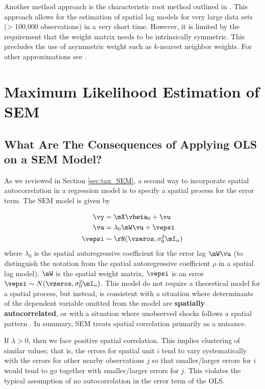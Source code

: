 \documentclass[english,12pt]{book}\usepackage[]{graphicx}\usepackage[]{xcolor}
\begin{document}
Another method approach is the characteristic root method outlined in \cite{smirnov2001fast}. This approach allows for the estimation of spatial lag models for very large data sets (> 100,000 observations) in a very short time. However, it is limited by the requirement that the weight matrix needs to be intrinsically symmetric. This precludes the use of asymmetric weight such as $k$-nearest neighbor weights. For other approximations see \citet[][chapter 4]{lesage2010introduction}.

\section{Maximum Likelihood Estimation of SEM}\label{sec:sem-ml}

\subsection{What Are The Consequences of Applying OLS on a SEM Model?}

As we reviewed in Section \ref{sec:tax_SEM}, a second way to incorporate spatial autocorrelation in a regression model is to specify a spatial process for the error term.  The SEM model is given by

\begin{equation}\label{eq:sem_ml}
	\begin{aligned}
	\vy  & = \mX\vbeta_0 + \vu \\ 
	 \vu & = \lambda_0 \mW \vu + \vepsi \\
	 \vepsi & \sim \rN(\vzeros, \sigma^2_0\mI_n)
	\end{aligned}
\end{equation}
%
where $\lambda_0$ is the spatial autoregressive coefficient for the error lag $\mW\vu$ (to distinguish the notation from the spatial autoregressive coefficient $\rho$ in a spatial lag model), $\mW$ is the spatial weight matrix, $\vepsi$ is an error $\vepsi \sim N(\vzeros, \sigma^2_0\mI_n)$. This model do not require a theoretical model for a spatial process, but instead, is consistent with a situation where determinants of the dependent variable omitted from the model are \textbf{spatially autocorrelated}, or with a situation where unobserved shocks follows a spatial pattern \citep{elhorst2014spatial}. In summary, SEM treats spatial correlation primarily as a nuisance. 

If $\lambda > 0$, then we face positive spatial correlation. This implies clustering of similar values; that is, the errors for spatial unit $i$ tend to vary systematically with the errors for other nearby observations $j$ so that smaller/larger errors for $i$ would tend to go together with smaller/larger errors for $j$. This violates the typical assumption of no autocorrelation in the error term of the OLS. 
\end{document}
